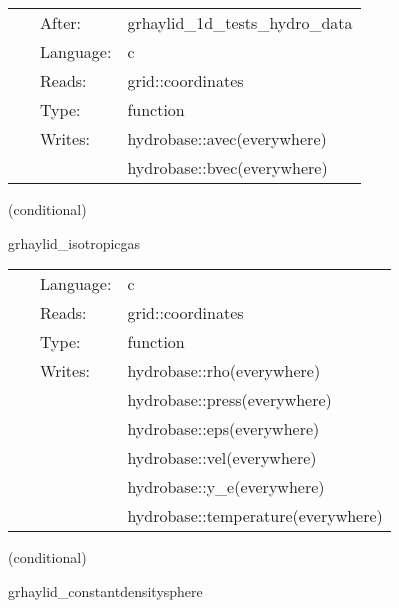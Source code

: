 \hspace{5mm}{\it set initial magnetic data for 1d test } 


\hspace{5mm}

 \begin{tabular*}{160mm}{cll} 
~ & After:  & grhaylid\_1d\_tests\_hydro\_data \\ 
~ & Language:  & c \\ 
~ & Reads:  & grid::coordinates \\ 
~ & Type:  & function \\ 
~ & Writes:  & hydrobase::avec(everywhere) \\ 
~& ~ &hydrobase::bvec(everywhere)\\ 
\end{tabular*} 


\vspace{5mm}

   (conditional) 

\hspace{5mm} grhaylid\_isotropicgas 

\hspace{5mm}{\it set initial hydrodynamic data for 1d test } 


\hspace{5mm}

 \begin{tabular*}{160mm}{cll} 
~ & Language:  & c \\ 
~ & Reads:  & grid::coordinates \\ 
~ & Type:  & function \\ 
~ & Writes:  & hydrobase::rho(everywhere) \\ 
~& ~ &hydrobase::press(everywhere)\\ 
~& ~ &hydrobase::eps(everywhere)\\ 
~& ~ &hydrobase::vel(everywhere)\\ 
~& ~ &hydrobase::y\_e(everywhere)\\ 
~& ~ &hydrobase::temperature(everywhere)\\ 
\end{tabular*} 


\vspace{5mm}

   (conditional) 

\hspace{5mm} grhaylid\_constantdensitysphere 

\hspace{5mm}{\it set initial hydrodynamic data for 1d test } 


